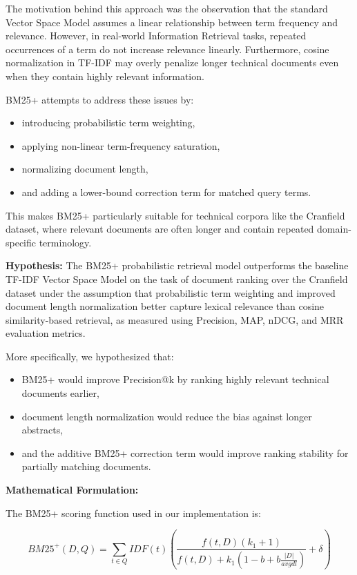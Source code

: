 \documentclass{article}
\begin{document}
The motivation behind this approach was the observation that the standard Vector Space Model assumes a linear relationship between term frequency and relevance. However, in real-world Information Retrieval tasks, repeated occurrences of a term do not increase relevance linearly. Furthermore, cosine normalization in TF-IDF may overly penalize longer technical documents even when they contain highly relevant information.

BM25+ attempts to address these issues by:
\begin{itemize}
    \item introducing probabilistic term weighting,
    \item applying non-linear term-frequency saturation,
    \item normalizing document length,
    \item and adding a lower-bound correction term for matched query terms.
\end{itemize}

This makes BM25+ particularly suitable for technical corpora like the Cranfield dataset, where relevant documents are often longer and contain repeated domain-specific terminology.

\textbf{Hypothesis:} The BM25+ probabilistic retrieval model outperforms the baseline TF-IDF Vector Space Model on the task of document ranking over the Cranfield dataset under the assumption that probabilistic term weighting and improved document length normalization better capture lexical relevance than cosine similarity-based retrieval, as measured using Precision, MAP, nDCG, and MRR evaluation metrics.

More specifically, we hypothesized that:
\begin{itemize}
    \item BM25+ would improve Precision@k by ranking highly relevant technical documents earlier,
    \item document length normalization would reduce the bias against longer abstracts,
    \item and the additive BM25+ correction term would improve ranking stability for partially matching documents.
\end{itemize}

\textbf{Mathematical Formulation:}

The BM25+ scoring function used in our implementation is:

\[
BM25^{+}(D,Q)=\sum_{t\in Q} IDF(t)\left(
\frac{f(t,D)(k_1+1)}
{f(t,D)+k_1\left(1-b+b\frac{|D|}{avgdl}\right)}
+\delta
\right)
\]
\end{document}

